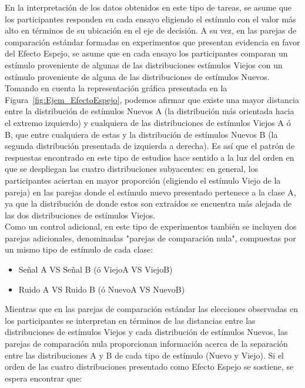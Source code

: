 \begin{itemize}
En la interpretación de los datos obtenidos en este tipo de tareas, se asume que los participantes responden en cada ensayo eligiendo el estímulo con el valor más alto en términos de su ubicación en el eje de decisión. A su vez, en las parejas de comparación estándar formadas en experimentos que presentan evidencia en favor del Efecto Espejo, se asume que en cada ensayo los participantes comparan un estímulo proveniente de algunas de las distribuciones estímulos Viejos con un estímulo proveniente de alguna de las distribuciones de estímulos Nuevos. Tomando en cuenta la representación gráfica presentada en la Figura~\ref{fig:Ejem_EfectoEspejo}, podemos afirmar que existe una mayor distancia entre la distribución de estímulos Nuevos A (la distribución más orientada hacia el extremo izquierdo) y cualquiera de las distribuciones de estímulos Viejos A ó B, que entre cualquiera de estas y la distribución de estímulos Nuevos B (la segunda distribución presentada de izquierda a derecha). Es así que el patrón de respuestas encontrado en este tipo de estudios hace sentido a la luz del orden en que se despliegan las cuatro distribuciones subyacentes: en general, los participantes aciertan en mayor proporción (eligiendo el estímulo Viejo de la pareja) en las parejas donde el estímulo nuevo presentado pertenece a la clase A, ya que la distribución de donde estos  son extraídos se encuentra más alejada de las dos distribuciones de estímulos Viejos.\\

Como un control adicional, en este tipo de experimentos también se incluyen dos parejas adicionales, denominadas "parejas de comparación nula", compuestas por un mismo tipo de estímulo de cada clase:\\

\begin{itemize}
\item Señal A VS Señal B (ó ViejoA VS ViejoB)\\
\item Ruido A VS Ruido B (ó NuevoA VS NuevoB)\\
\end{itemize}

Mientras que en las parejas de comparación estándar las elecciones observadas en los participantes se interpretan en términos de las distancias entre las distribuciones de estímulos Viejos y cada distribución de estímulos Nuevos, las parejas de comparación nula proporcionan información acerca de la separación entre las distribuciones A y B de cada tipo de estímulo (Nuevo y Viejo). Si el orden de las cuatro distribuciones presentado como Efecto Espejo se sostiene, se espera encontrar que:\\


\end{itemize}
